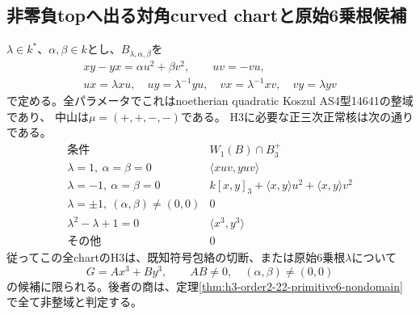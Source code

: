 \subsection{非零負topへ出る対角curved chartと原始6乗根候補}
\label{subsec:h3-order2-22-curved-diagonal}
\begin{proposition}\label{prop:h3-order2-22-curved-diagonal}
$\lambda\in k^*$、$\alpha,\beta\in k$とし、$B_{\lambda,\alpha,\beta}$を
\begin{gather*}
 xy-yx=\alpha u^2+\beta v^2,\qquad uv=-vu,\\
 ux=\lambda xu,\quad uy=\lambda^{-1}yu,\quad
 vx=\lambda^{-1}xv,\quad vy=\lambda yv
\end{gather*}
で定める。全パラメータでこれはnoetherian quadratic Koszul AS4型14641の整域であり、
中山は$\mu=(+,+,-,-)$である。
H3に必要な正三次正常核は次の通りである。
\[
\begin{array}{c|c}
\text{条件}&W_1(B)\cap B_3^+\\\hline
\lambda=1,\ \alpha=\beta=0&\langle xuv,yuv\rangle\\
\lambda=-1,\ \alpha=\beta=0&k[x,y]_3+\langle x,y\rangle u^2+\langle x,y\rangle v^2\\
\lambda=\pm1,\ (\alpha,\beta)\ne(0,0)&0\\
\lambda^2-\lambda+1=0&\langle x^3,y^3\rangle\\
\text{その他}&0
\end{array}
\]
従ってこの全chartのH3は、既知符号包絡の切断、または原始6乗根$\lambda$について
\[
 G=A x^3+B y^3,\qquad AB\ne0,\quad(\alpha,\beta)\ne(0,0)
\]
の候補に限られる。後者の商は、定理\ref{thm:h3-order2-22-primitive6-nondomain}で全て非整域と判定する。
\end{proposition}
